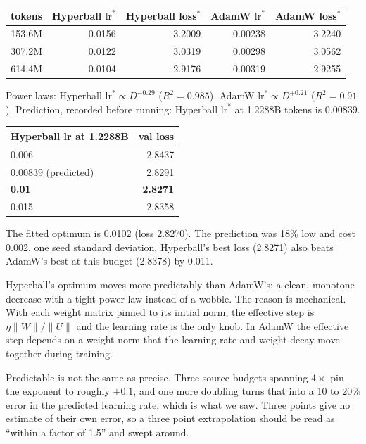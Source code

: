 \documentclass[10pt,letterpaper]{article}
\newcommand{\lrs}{\ensuremath{\mathrm{lr}^{*}}}
\begin{document}
\begin{table}[H]\centering\small
\begin{tabular}{rrrrr}\toprule
tokens & Hyperball $\lrs$ & Hyperball loss$^*$ & AdamW $\lrs$ & AdamW loss$^*$\\\midrule
153.6M & 0.0156 & 3.2009 & 0.00238 & 3.2240\\
307.2M & 0.0122 & 3.0319 & 0.00298 & 3.0562\\
614.4M & 0.0104 & 2.9176 & 0.00319 & 2.9255\\\bottomrule
\end{tabular}
\end{table}

Power laws: Hyperball $\lrs\propto D^{-0.29}$ ($R^2=0.985$), AdamW $\lrs\propto D^{+0.21}$ ($R^2=0.91$). Prediction, recorded before running: Hyperball $\lrs$ at 1.2288B tokens is 0.00839.

\begin{table}[H]\centering\small
\begin{tabular}{lr}\toprule
Hyperball lr at 1.2288B & val loss\\\midrule
0.006 & 2.8437\\
0.00839 (predicted) & 2.8291\\
\textbf{0.01} & \textbf{2.8271}\\
0.015 & 2.8358\\\bottomrule
\end{tabular}
\end{table}

The fitted optimum is 0.0102 (loss 2.8270). The prediction was 18\% low and cost 0.002, one seed standard deviation. Hyperball's best loss (2.8271) also beats AdamW's best at this budget (2.8378) by 0.011.

Hyperball's optimum moves more predictably than AdamW's: a clean, monotone decrease with a tight power law instead of a wobble. The reason is mechanical. With each weight matrix pinned to its initial norm, the effective step is $\eta\lVert W\rVert/\lVert U\rVert$ and the learning rate is the only knob. In AdamW the effective step depends on a weight norm that the learning rate and weight decay move together during training.

Predictable is not the same as precise. Three source budgets spanning $4\times$ pin the exponent to roughly $\pm0.1$, and one more doubling turns that into a 10 to 20\% error in the predicted learning rate, which is what we saw. Three points give no estimate of their own error, so a three point extrapolation should be read as ``within a factor of 1.5'' and swept around.
\end{document}
